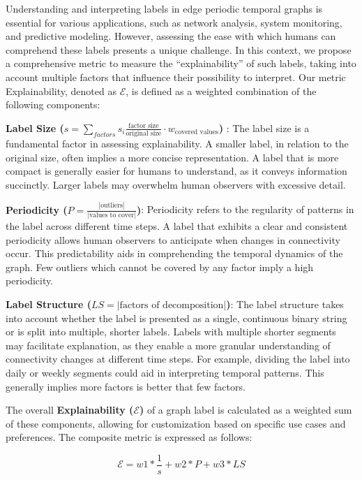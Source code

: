 Understanding and interpreting labels in edge periodic temporal graphs is essential for various applications, such as network analysis, system monitoring, and predictive modeling. However, assessing the ease with which humans can comprehend these labels presents a unique challenge. In this context, we propose a comprehensive metric to measure the \enquote{explainability} of such labels, taking into account multiple factors that influence their possibility to interpret. Our metric Explainability, denoted as $\mathcal{E}$, is defined as a weighted combination of the following components:

\textbf{Label Size ($s = \sum_{factors} s_i \frac{\text{factor size}}{\text{original size}} \cdot w_\text{covered values}$) }: The label size is a fundamental factor in assessing explainability. A smaller label, in relation to the original size, often implies a more concise representation. A label that is more compact is generally easier for humans to understand, as it conveys information succinctly. Larger labels may overwhelm human observers with excessive detail.

\textbf{Periodicity ($P = \frac{|\text{outliers}|}{|\text{values to cover}|}$)}: Periodicity refers to the regularity of patterns in the label across different time steps. A label that exhibits a clear and consistent periodicity allows human observers to anticipate when changes in connectivity occur. This predictability aids in comprehending the temporal dynamics of the graph. Few outliers which cannot be covered by any factor imply a high periodicity.

\textbf{Label Structure ($LS = |\text{factors of decomposition}|$)}: The label structure takes into account whether the label is presented as a single, continuous binary string or is split into multiple, shorter labels. Labels with multiple shorter segments may facilitate explanation, as they enable a more granular understanding of connectivity changes at different time steps. For example, dividing the label into daily or weekly segments could aid in interpreting temporal patterns. This generally implies more factors is better that few factors.

The overall \textbf{Explainability ($\mathcal{E}$)} of a graph label is calculated as a weighted sum of these components, allowing for customization based on specific use cases and preferences. The composite metric is expressed as follows:

\[
\mathcal{E} = w1 * \frac{1}{s} + w2 * P + w3 * LS
\]

